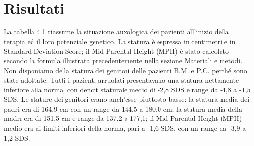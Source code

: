 \chapter{Risultati}

La tabella 4.1 riassume la situazione auxologica dei pazienti all'inizio della terapia ed il loro potenziale genetico. La statura è espressa in centimetri e in Standard Deviation Score; il Mid-Parental Height (MPH) è stato calcolato secondo la formula illustrata precedentemente nella sezione Materiali e metodi. Non disponiamo della statura dei genitori delle pazienti B.M. e P.C. perché sono state adottate. Tutti i pazienti arruolati presentavano una statura nettamente inferiore alla norma, con deficit staturale medio di -2,8 SDS e range da -4,8 a -1,5 SDS. Le stature dei genitori erano anch'esse piuttosto basse: la statura media dei padri era di 164,9 cm con un range da 144,5 a 180,0 cm; la statura media della madri era di 151,5 cm e range da 137,2 a 177,1; il Mid-Parental Height (MPH) medio era ai limiti inferiori della norma, pari a -1,6 SDS, con un range da -3,9 a 1,2 SDS.

